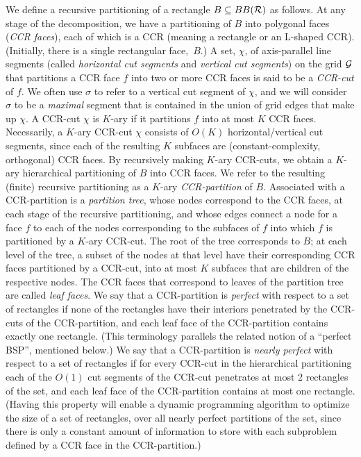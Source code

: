 \documentclass{article}
\newcommand{\B}{BB({\cal R})}
\begin{document}
\medskip
{}\quad
We define a recursive partitioning of a rectangle $B\subseteq \B$ as
follows.  At any stage of the decomposition, we have a partitioning of
$B$ into polygonal faces ({\em CCR faces}), each of which is a CCR
(meaning a rectangle or an L-shaped CCR). (Initially, there is a
single rectangular face,~$B$.)
%
A set, $\chi$, of axis-parallel line segments (called {\em horizontal
  cut segments} and {\em vertical cut segments}) on the grid ${\cal
  G}$ that partitions a CCR face $f$ into two or more CCR faces is
said to be a {\em CCR-cut} of $f$.  We often use $\sigma$ to refer to
a vertical cut segment of $\chi$, and we will consider $\sigma$ to be
a {\em maximal} segment that is contained in the union of grid edges
that make up $\chi$.
%
A CCR-cut $\chi$ is $K$-ary if it partitions $f$ into at most $K$ CCR
faces.  Necessarily, a $K$-ary CCR-cut $\chi$ consists of $O(K)$
horizontal/vertical cut segments, since each of the resulting $K$
subfaces are (constant-complexity, orthogonal) CCR faces.
%
%
By recursively making $K$-ary CCR-cuts, we obtain a $K$-ary hierarchical
partitioning of $B$ into CCR faces.  We refer to the resulting
(finite) recursive partitioning as a $K$-ary {\em CCR-partition} of $B$.
%
Associated with a CCR-partition is a {\em partition tree}, whose nodes
correspond to the CCR faces, at each stage of the recursive
partitioning, and whose edges connect a node for a face $f$ to each of
the nodes corresponding to the subfaces of $f$ into which $f$ is
partitioned by a $K$-ary CCR-cut.  The root of the tree corresponds to
$B$; at each level of the tree, a subset of the nodes at that level
have their corresponding CCR faces partitioned by a CCR-cut, into at
most $K$ subfaces that are children of the respective nodes.  The CCR
faces that correspond to leaves of the partition tree are called {\em
  leaf faces}.
%
%
We say that a CCR-partition is {\em perfect} with respect to a set of
rectangles if none of the rectangles have their interiors penetrated
by the CCR-cuts of the CCR-partition, and each leaf face of the
CCR-partition contains exactly one rectangle.  (This terminology
parallels the related notion of a ``perfect BSP'', mentioned below.)
%
We say that a CCR-partition is {\em nearly perfect} with respect to a
set of rectangles if for every CCR-cut in the hierarchical
partitioning each of the $O(1)$ cut segments of the CCR-cut penetrates
at most 2 rectangles of the set, and each leaf face of the
CCR-partition contains at most one rectangle.
%
(Having this property will enable a dynamic programming algorithm to
optimize the size of a set of rectangles, over all nearly perfect
partitions of the set, since there is only a constant amount of
information to store with each subproblem defined by a CCR face in the
CCR-partition.)
\end{document}
